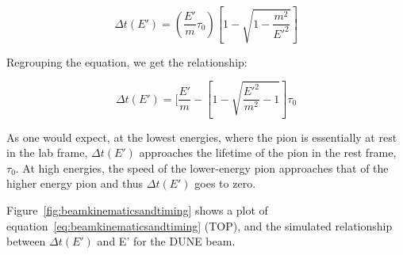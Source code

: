 \documentclass[preprint,12pt]{elsarticle}
\begin{document}
\begin{equation}
\Delta t(E') = (\frac{E'}{m} \tau_0) [1 - \sqrt{ 1 - \frac{m^2}{E'^2}}]
\end{equation}

Regrouping the equation, we get the relationship:

\begin{equation}
\Delta t(E') = [\frac{E'}{m} - [1 - \sqrt{ \frac{E'^2}{m^2} - 1}] \tau_0
\label{eq:beamkinematicsandtiming}
\end{equation}

As one would expect, at the lowest energies, where the pion is essentially at rest in the lab frame, $\Delta t(E')$ approaches the lifetime of the pion in the rest frame, $\tau_0$. At high energies, the speed of the lower-energy pion approaches that of the higher energy pion and thus $\Delta t(E')$ goes to zero. 

Figure~\ref{fig:beamkinematicsandtiming} shows a plot of equation~\ref{eq:beamkinematicsandtiming} (TOP), and the simulated relationship between $\Delta t(E')$ and E' for the DUNE beam.
\end{document}
